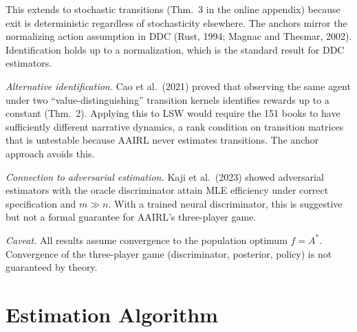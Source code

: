 \documentclass[11pt]{article}
\begin{document}
This extends to stochastic transitions (Thm.\ 3 in the online appendix) because exit is deterministic regardless of stochasticity elsewhere. The anchors mirror the normalizing action assumption in DDC (Rust, 1994; Magnac and Thesmar, 2002). Identification holds up to a normalization, which is the standard result for DDC estimators.

\smallskip\noindent\textit{Alternative identification.} Cao et al.\ (2021) proved that observing the same agent under two ``value-distinguishing'' transition kernels identifies rewards up to a constant (Thm.\ 2). Applying this to LSW would require the 151 books to have sufficiently different narrative dynamics, a rank condition on transition matrices that is untestable because AAIRL never estimates transitions. The anchor approach avoids this.

\smallskip\noindent\textit{Connection to adversarial estimation.} Kaji et al.\ (2023) showed adversarial estimators with the oracle discriminator attain MLE efficiency under correct specification and $m \gg n$. With a trained neural discriminator, this is suggestive but not a formal guarantee for AAIRL's three-player game.

\smallskip\noindent\textit{Caveat.} All results assume convergence to the population optimum $f = A^*$. Convergence of the three-player game (discriminator, posterior, policy) is not guaranteed by theory.


\section{Estimation Algorithm}
\end{document}
